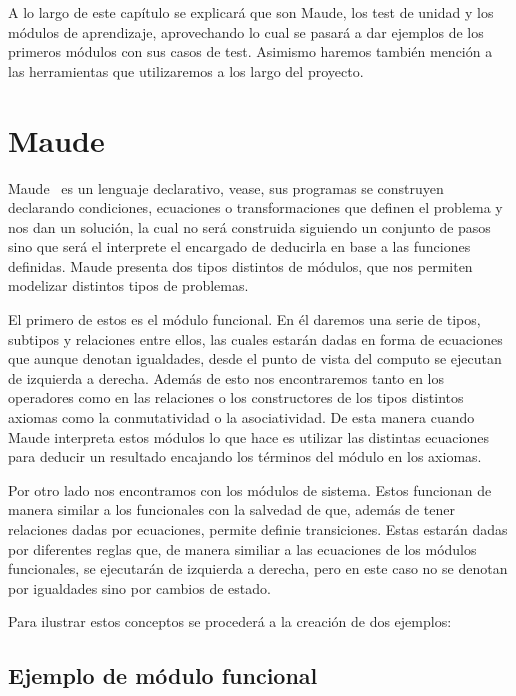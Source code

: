 
A lo largo de este capítulo se explicará que son Maude, los test de unidad y los módulos de aprendizaje, aprovechando lo cual se pasará a dar ejemplos de los primeros módulos con sus casos de test. Asimismo haremos también mención a las herramientas que utilizaremos a los largo del proyecto.\par

\section{Maude}

Maude~\cite{maudeBook} es un lenguaje declarativo, vease, sus programas se construyen declarando condiciones, ecuaciones o transformaciones que definen el problema y nos dan un solución, la cual no será construida siguiendo un conjunto de pasos sino que será el interprete el encargado de deducirla en base a las funciones definidas. Maude presenta dos tipos distintos de módulos, que nos permiten modelizar distintos tipos de problemas.\par

El primero de estos es el módulo funcional. En él daremos una serie de tipos, subtipos y relaciones entre ellos, las cuales estarán dadas en forma de ecuaciones que aunque denotan igualdades, desde el punto de vista del computo se ejecutan de izquierda a derecha. Además de esto nos encontraremos tanto en los operadores como en las relaciones o los constructores de los tipos distintos axiomas como la conmutatividad o la asociatividad. De esta manera cuando Maude interpreta estos módulos lo que hace es utilizar las distintas ecuaciones para deducir un resultado encajando los términos del módulo en los axiomas.\par

Por otro lado nos encontramos con los módulos de sistema. Estos funcionan de manera similar a los funcionales con la salvedad de que, además de tener relaciones dadas por ecuaciones, permite definie transiciones. Estas estarán dadas por diferentes reglas que, de manera similiar a las ecuaciones de los módulos funcionales, se ejecutarán de izquierda a derecha, pero en este caso no se denotan por igualdades sino por cambios de estado.\par

Para ilustrar estos conceptos se procederá a la creación de dos ejemplos: \par

\subsection{Ejemplo de módulo funcional}

